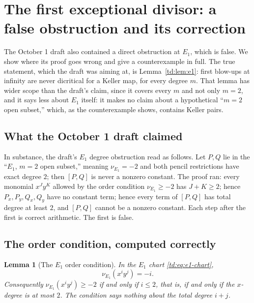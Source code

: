 \documentclass[a4paper,11pt]{article}
\theoremstyle{jsplain}
\newtheorem{lemma}[theorem]{Lemma}
\theoremstyle{jsdef}
\theoremstyle{jsrem}
\begin{document}
\section{The first exceptional divisor: a false obstruction and its correction}\label{td:sec:e1}

The October 1 draft also contained a direct obstruction at $E_1$, which is false. We show where
its proof goes wrong and give a counterexample in full. The true statement, which the draft was
aiming at, is Lemma~\ref{td:lem:e1}: first blow-ups at infinity are never dicritical for a Keller
map, for every degree $m$. That lemma has wider scope than the draft's claim, since it covers every
$m$ and not only $m = 2$, and it says less about $E_1$ itself: it makes no claim about a
hypothetical ``$m = 2$ open subset,'' which, as the counterexample shows, contains Keller pairs.

\subsection{What the October 1 draft claimed}

In substance, the draft's $E_1$ degree obstruction read as follows. Let $P, Q$ lie in the
``$E_1$, $m = 2$ open subset,'' meaning $\nu_{E_1} = -2$ and both pencil restrictions have exact
degree $2$; then $[P,Q]$ is never a nonzero constant. The proof ran: every monomial $x^J y^K$
allowed by the order condition $\nu_{E_1} \geq -2$ has $J + K \geq 2$; hence $P_x, P_y, Q_x, Q_y$
have no constant term; hence every term of $[P,Q]$ has total degree at least $2$, and $[P,Q]$
cannot be a nonzero constant. Each step after the first is correct arithmetic. The first is false.

\subsection{The order condition, computed correctly}

\begin{lemma}[The $E_1$ order condition]\label{td:lem:e1-order}
In the $E_1$ chart \eqref{td:eq:e1-chart},
\begin{equation}\label{td:eq:e1-valuation}
\nu_{E_1}(x^i y^j) = -i.
\end{equation}
Consequently $\nu_{E_1}(x^i y^j) \geq -2$ if and only if $i \leq 2$, that is, if and only if the
$x$-degree is at most $2$. The condition says nothing about the total degree $i + j$.
\end{lemma}
\end{document}
